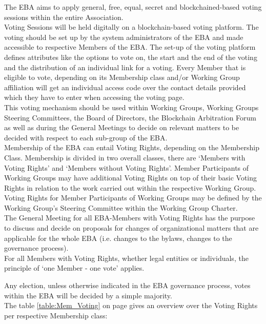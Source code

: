 \documentclass{article}
\begin{document}
The EBA aims to apply general, free, equal, secret and blockchained-based voting sessions within the entire Association. \\
Voting Sessions will be held digitally on a blockchain-based voting platform. 
The voting should be set up by the system administrators of the EBA and made accessible to respective Members of the EBA. 
The set-up of the voting platform defines attributes like the options to vote on, the start and the end of the voting and the distribution of an individual link for a voting. 
Every Member that is eligible to vote, depending on its Membership class and/or Working Group affiliation will get an individual access code over the contact details provided which they have to enter when accessing the voting page. \\
This voting mechanism should be used within Working Groups, Working Groups Steering Committees, the Board of Directors, the Blockchain Arbitration Forum as well as during the General Meetings to decide on relevant matters to be decided with respect to each sub-group of the EBA. \\
Membership of the EBA can entail Voting Rights, depending on the Membership Class. 
Membership is divided in two overall classes, there are ‘Members with Voting Rights’ and ‘Members without Voting Rights’. 
Member Participants of Working Groups may have additional Voting Rights on top of their basic Voting Rights in relation to the work carried out within the respective Working Group. 
Voting Rights for Member Participants of Working Groups may be defined by the Working Group’s Steering Committee within the Working Group Charter. \\
The General Meeting for all EBA-Members with Voting Rights has the purpose to discuss and decide on proposals for changes of organizational matters that are applicable for the whole EBA (i.e. changes to the bylaws, changes to the governance process). \\
For all Members with Voting Rights, whether legal entities or individuals, the principle of ‘one Member - one vote’ applies.

Any election, unless otherwise indicated in the EBA governance process, votes within the EBA will be decided by a simple majority. \\
The table \ref{table:Mem_Voting} on page \pageref{table:Mem_Voting} gives an overview over the Voting Rights per respective Membership class: \\
\end{document}
